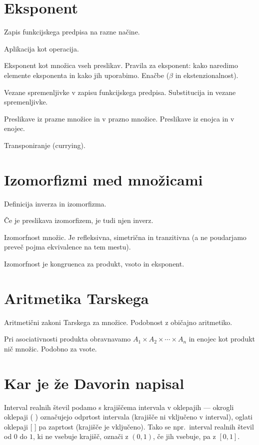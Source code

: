 \section{Eksponent}
\label{sec:eksponent}



Zapis funkcijskega predpisa na razne načine.

Aplikacija kot operacija.

Eksponent kot množica vseh preslikav. Pravila za eksponent: kako naredimo elemente
eksponenta in kako jih uporabimo. Enačbe ($\beta$ in ekstenzionalnost).

Vezane spremenljivke v zapisu funkcijskega predpisa. Substitucija in vezane spremenljivke.

Preslikave iz prazne množice in v prazno množice. Preslikave iz enojca in v enojec.


Transponiranje (currying).


\section{Izomorfizmi med množicami}
\label{sec:izom-med-mnoic}

Definicija inverza in izomorfizma.

Če je preslikava izomorfizem, je tudi njen inverz.

Izomorfnost množic. Je refleksivna, simetrična in tranzitivna (a ne poudarjamo preveč pojma ekvivalence na tem mestu).

Izomorfnost je kongruenca za produkt, vsoto in eksponent.

\section{Aritmetika Tarskega}
\label{sec:aritmetika-tarskega}

Aritmetični zakoni Tarskega za množice. Podobnost z običajno aritmetiko.

Pri asociativnosti produkta obravnavamo $A_1 \times A_2 \times \cdots \times A_n$ in
enojec kot produkt nič množic. Podobno za vsote.


\section{Kar je že Davorin napisal}

Interval realnih števil podamo s krajiščema intervala v oklepajih --- okrogli oklepaji ( ) označujejo odprtost intervala (krajišče ni vključeno v interval), oglati oklepaji [ ] pa zaprtost (krajišče je vključeno). Tako se npr.~interval realnih števil od $0$ do $1$, ki ne vsebuje krajišč, označi z $(0, 1)$, če jih vsebuje, pa z $[0, 1]$.

